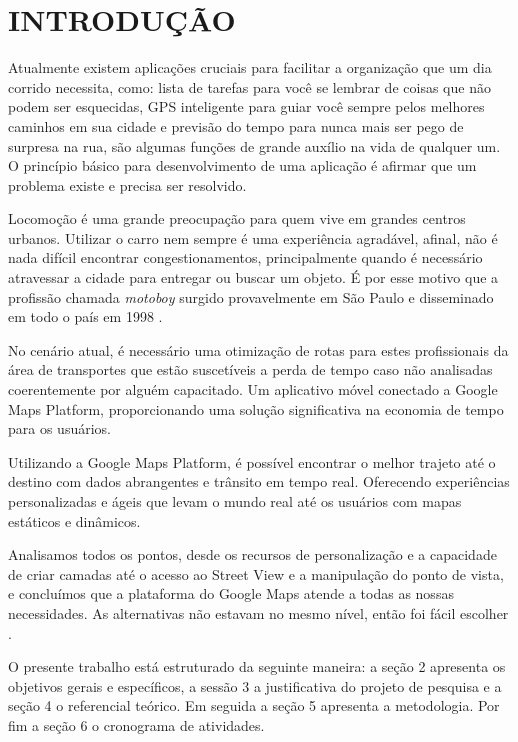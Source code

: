 
\chapter{INTRODUÇÃO}

Atualmente existem aplicações cruciais para facilitar a organização que um dia corrido necessita, como: lista de tarefas para você se lembrar de coisas que não podem ser esquecidas, GPS inteligente para guiar você sempre pelos melhores caminhos em sua cidade e previsão do tempo para nunca mais ser pego de surpresa na rua, são algumas funções de grande auxílio na vida de qualquer um. O princípio básico para desenvolvimento de uma aplicação é afirmar que um problema existe e precisa ser resolvido.

Locomoção é uma grande preocupação para quem vive em grandes centros urbanos. Utilizar o carro nem sempre é uma experiência agradável, afinal, não é nada difícil encontrar congestionamentos, principalmente quando é necessário atravessar a cidade para entregar ou buscar um objeto. É por esse motivo que a profissão chamada \textit{motoboy} surgido provavelmente em São Paulo e disseminado em todo o país em 1998 \cite{MotoboyVeja}.

No cenário atual, é necessário uma otimização de rotas para estes profissionais da área de transportes que estão suscetíveis a perda de tempo caso não analisadas coerentemente por alguém capacitado. Um aplicativo móvel conectado a Google Maps Platform, proporcionando uma solução significativa na economia de tempo para os usuários.

Utilizando a Google Maps Platform, é possível encontrar o melhor trajeto até o destino com dados abrangentes e trânsito em tempo real. Oferecendo experiências personalizadas e ágeis que levam o mundo real até os usuários com mapas estáticos e dinâmicos. 

\begin{citacao}
Analisamos todos os pontos, desde os recursos de personalização e a capacidade de criar camadas até o acesso ao Street View e a manipulação do ponto de vista, e concluímos que a plataforma do Google Maps atende a todas as nossas necessidades. As alternativas não estavam no mesmo nível, então foi fácil escolher \cite{ElizabethSchreierGoogleMaps}. 
\end{citacao}

O presente trabalho está estruturado da seguinte maneira: a seção 2 apresenta os objetivos gerais e específicos, a sessão 3 a justificativa do projeto de pesquisa e a seção 4 o referencial teórico.
Em seguida a seção 5 apresenta a metodologia. Por fim a seção 6 o cronograma de atividades.